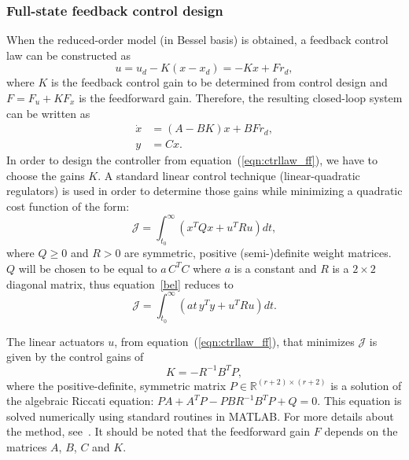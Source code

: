 \documentclass[12pt]{iopart}
\begin{document}
\subsubsection{Full-state feedback control design} 

When the reduced-order model (in Bessel basis) is obtained, a feedback control law can be constructed as
\begin{equation}
   u = u_{d} - K(x - x_{d}) = - Kx + Fr_{d},
   \label{eqn:ctrllaw_ff}
\end{equation}
where $K$ is the feedback control gain to be determined from control design and $F = F_u + K F_x$ is the feedforward gain.  Therefore, the resulting closed-loop system can be written as
\begin{align}
      \dot{x} &= (A-BK) x + BF r_{d}, \\
      y &= C x.
\end{align}
In order to design the controller from equation~(\ref{eqn:ctrllaw_ff}), we have to choose the gains $K$.
A  standard linear control technique (linear-quadratic regulators) is used in order to determine those gains while minimizing a quadratic cost function of the form:
\begin{equation}
 \mathcal{J} = \int_{t_0}^\infty \left( x^T Q x + u^T R u \right) dt,
 \label{bel}
\end{equation}
where $Q\ge 0$ and $R>0$ are symmetric, positive (semi-)definite weight matrices. $Q$ will be chosen to be equal to $a \, C^{T} C$ where $a$ is a constant and $R$ is a $2 \times 2$ diagonal matrix, thus equation~\ref{bel} reduces to
\begin{equation}
   \mathcal{J} = \int_{t_0}^\infty \left( a t\, y^T y + u^T R u \right) dt.
\end{equation}

 
The linear actuators $u$, from equation~(\ref{eqn:ctrllaw_ff}), that minimizes $\mathcal{J}$ is given by the control gains of
\begin{equation}
   K  = - R^{-1} B^T P,
\end{equation}
where the positive-definite, symmetric matrix $P \in \mathbb{R}^{(r+2) \times (r+2)}$ is a solution of the algebraic Riccati equation: $P {A} + {A}^T P - P {B} R^{-1} B^T P + Q = 0$.  This equation is solved numerically using standard routines in MATLAB. For more details about the method, see~\cite{SandP, AandM, Stengel}.
It should be noted that the feedforward gain $F$  depends on the matrices $A$, $B$, $C$ and $K$.
\end{document}
